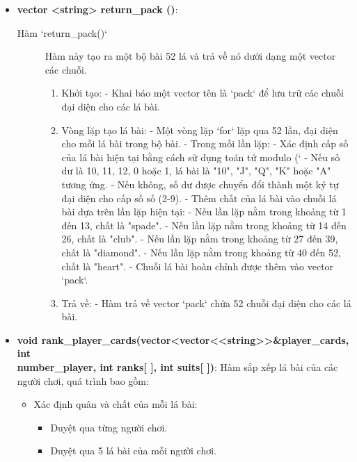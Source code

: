 \documentclass{article}
\begin{document}
\begin{itemize}
    \item \textbf{vector <string> return\_pack ()}: 
    \begin{description}
\item[Hàm `return\_pack()`]
    Hàm này tạo ra một bộ bài 52 lá và trả về nó dưới dạng một vector các chuỗi.
    \begin{enumerate}
        \item Khởi tạo:
            - Khai báo một vector tên là `pack` để lưu trữ các chuỗi đại diện cho các lá bài.
        \item Vòng lặp tạo lá bài:
            - Một vòng lặp `for` lặp qua 52 lần, đại diện cho mỗi lá bài trong bộ bài.
            - Trong mỗi lần lặp:
                - Xác định cấp số của lá bài hiện tại bằng cách sử dụng toán tử modulo (`%
                    - Nếu số dư là 10, 11, 12, 0 hoặc 1, lá bài là "10", "J", "Q", "K" hoặc "A" tương ứng.
                    - Nếu không, số dư được chuyển đổi thành một ký tự đại diện cho cấp số số (2-9).
                - Thêm chất của lá bài vào chuỗi lá bài dựa trên lần lặp hiện tại:
                    - Nếu lần lặp nằm trong khoảng từ 1 đến 13, chất là "spade".
                    - Nếu lần lặp nằm trong khoảng từ 14 đến 26, chất là "club".
                    - Nếu lần lặp nằm trong khoảng từ 27 đến 39, chất là "diamond".
                    - Nếu lần lặp nằm trong khoảng từ 40 đến 52, chất là "heart".
                - Chuỗi lá bài hoàn chỉnh được thêm vào vector `pack`.
        \item Trả về:
            - Hàm trả về vector `pack` chứa 52 chuỗi đại diện cho các lá bài.
    \end{enumerate}
\end{description}
    \item \textbf{void rank\_player\_cards(vector<vector<<string>>\&player\_cards, int \\number\_player, int ranks[ ], int suits[ ])}: Hàm sắp xếp lá bài của các người chơi, quá trình bao gồm:
    \begin{description}
        \begin{itemize}
            \item Xác định quân và chất của mỗi lá bài:
                \begin{itemize}
                    \item Duyệt qua từng người chơi.
                    \item Duyệt qua 5 lá bài của mỗi người chơi.

\end{itemize}
\end{itemize}
\end{description}
\end{itemize}
\end{document}
